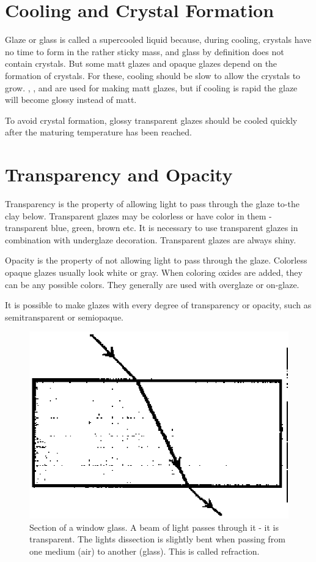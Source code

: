 \section{Cooling and Crystal Formation}
Glaze or glass is called a supercooled liquid because, during cooling, crystals 
have no time to form in the rather sticky mass, and glass by definition does 
not contain crystals. But some matt glazes and opaque glazes depend on the 
formation of crystals. For these, cooling should be slow to allow the crystals 
to grow. , , and  are used for making matt glazes, but 
if cooling is rapid the glaze will become glossy instead of matt.

To avoid crystal formation, glossy transparent glazes should be cooled quickly 
after the maturing temperature has been reached.
\section{Transparency and Opacity}
Transparency is the property of allowing light to pass through the glaze to-the 
clay below. Transparent glazes may be colorless or have color in them - 
transparent blue, green, brown etc. It is necessary to use transparent glazes 
in combination with underglaze decoration. Transparent glazes are always shiny.

Opacity is the property of not allowing light to pass through the glaze. 
Colorless opaque glazes usually look white or gray. When coloring oxides are 
added, they can be any possible colors. They generally are used with overglaze 
or on-glaze.

It is possible to make glazes with every degree of transparency or opacity, 
such as semitransparent or semiopaque.
\begin{figure}[htbp!]
  \centering
  \includegraphics[width=0.5\linewidth]{img/transparency.eps}
  \caption{Section of a window glass. A beam of light passes through it - it is 
  transparent. The lights dissection is slightly bent when passing from one 
  medium (air) to another (glass). This is called refraction.}
  \label{fig:transparency}
\end{figure}
